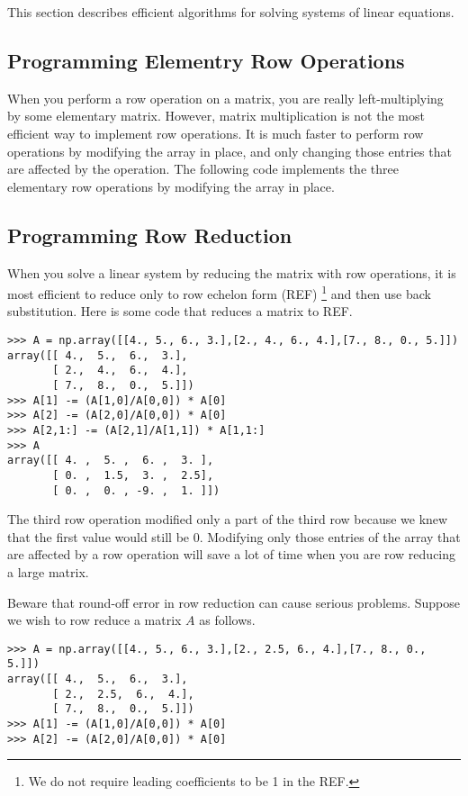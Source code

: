 This section describes efficient algorithms for solving systems of linear equations.

\subsection*{Programming Elementry Row Operations} %

When you perform a row operation on a matrix, you are really left-multiplying by some elementary matrix. 
However, matrix multiplication is not the most efficient way to implement row operations. It is much faster to perform row operations by modifying the array in place, and only changing those entries that are affected by the operation. 
The following code implements the three elementary row operations by modifying the array in place.



\subsection*{Programming Row Reduction} %

When you solve a linear system by reducing the matrix with row operations, it is most efficient to reduce only to row echelon form (REF)
\footnote{We do not require leading coefficients to be 1 in the REF.} 
and then use back substitution. 
Here is some code that reduces a matrix to REF.

\begin{lstlisting}
>>> A = np.array([[4., 5., 6., 3.],[2., 4., 6., 4.],[7., 8., 0., 5.]])
array([[ 4.,  5.,  6.,  3.],
       [ 2.,  4.,  6.,  4.],
       [ 7.,  8.,  0.,  5.]])
>>> A[1] -= (A[1,0]/A[0,0]) * A[0]
>>> A[2] -= (A[2,0]/A[0,0]) * A[0]
>>> A[2,1:] -= (A[2,1]/A[1,1]) * A[1,1:]
>>> A
array([[ 4. ,  5. ,  6. ,  3. ],
       [ 0. ,  1.5,  3. ,  2.5],
       [ 0. ,  0. , -9. ,  1. ]])
\end{lstlisting}

The third row operation modified only a part of the third row because we knew that the first value would still be 0. 
Modifying only those entries of the array that are affected by a row operation will save a lot of time when you are row reducing a large matrix.

Beware that round-off error in row reduction can cause serious problems.
Suppose we wish to row reduce a matrix $A$ as follows.

\begin{lstlisting}
>>> A = np.array([[4., 5., 6., 3.],[2., 2.5, 6., 4.],[7., 8., 0., 5.]])
array([[ 4.,  5.,  6.,  3.],
       [ 2.,  2.5,  6.,  4.],
       [ 7.,  8.,  0.,  5.]])
>>> A[1] -= (A[1,0]/A[0,0]) * A[0]
>>> A[2] -= (A[2,0]/A[0,0]) * A[0]
\end{lstlisting}

